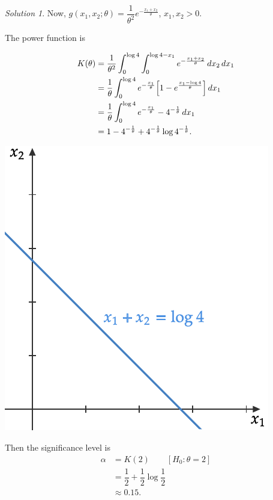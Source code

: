 \documentclass[svgnames, a5paper]{article}
\theoremstyle{definition}
\theoremstyle{remark}
\newtheorem*{Solution*}{Solution}
\begin{document}
\begin{enumerate}
\begin{Solution*}
Now, $g(x_1, x_2; \theta) = \dfrac 1 {\theta^2} e^{-\frac{x_1 + x_2}{\theta}}$, $x_1, x_2 > 0$.

The power function is\\
\begin{minipage}[h]{0.5\linewidth}
\begin{align*}
K(\theta) &= \dfrac 1 {\theta^2} \int_0^{\log 4} \int_0^{\log 4 - x_1} e^{-\frac{x_1 + x_2}{\theta}} \,dx_2 \,dx_1 \\
	&= \dfrac 1 \theta \int_0^{\log 4} e^{-\frac {x_1} \theta} \bqty{ 1 - e^{\frac{x_1 - \log 4}{\theta}} } \,dx_1 \\
	& = \dfrac 1 \theta \int_0^{\log 4} e^{-\frac {x_1} \theta} - 4^{- \frac 1 \theta} \,dx_1\\
	& = 1 - 4^{- \frac 1 \theta}  + 4^{- \frac 1 \theta} \log 4^{- \frac 1 \theta}.
\end{align*}
\end{minipage}\qquad
\begin{minipage}{0.4\linewidth}
\includegraphics[width=0.8\linewidth]{"x + y = log 4.pdf"}
\end{minipage}

Then the significance level is
\begin{align*}
\alpha & = K(2) \qquad [H_0 \colon \theta = 2]\\
	& =\dfrac 1 2 + \dfrac 1 2 \log \dfrac 1 2\\
	& \approx 0.15.
\end{align*}


\end{Solution*}
\end{enumerate}
\end{document}
